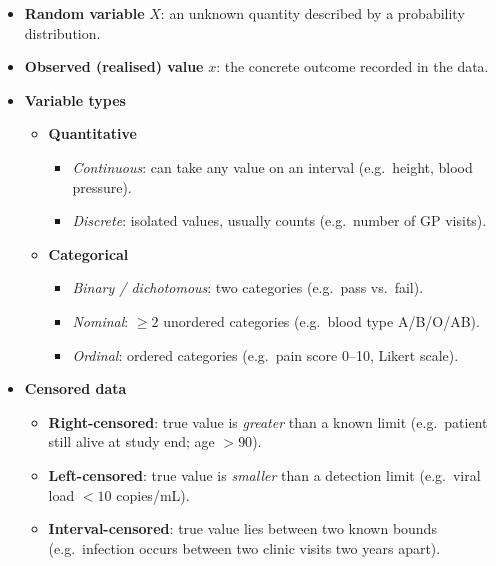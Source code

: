 \documentclass[12pt]{book}
\begin{document}
\begin{itemize}
  \item \textbf{Random variable} $X$: an unknown quantity described by a probability distribution.
  \item \textbf{Observed (realised) value} $x$: the concrete outcome recorded in the data.

  \item \textbf{Variable types}
        \begin{itemize}
          \item \textbf{Quantitative}
                \begin{itemize}
                  \item \emph{Continuous}: can take any value on an interval
                        (e.g.\ height, blood pressure).
                  \item \emph{Discrete}: isolated values, usually counts
                        (e.g.\ number of GP visits).
                \end{itemize}
          \item \textbf{Categorical}
                \begin{itemize}
                  \item \emph{Binary / dichotomous}: two categories
                        (e.g.\ pass vs.\ fail).
                  \item \emph{Nominal}: $\ge 2$ unordered categories
                        (e.g.\ blood type A/B/O/AB).
                  \item \emph{Ordinal}: ordered categories
                        (e.g.\ pain score 0–10, Likert scale).
                \end{itemize}
        \end{itemize}

  \item \textbf{Censored data}
        \begin{itemize}
          \item \textbf{Right-censored}: true value is \emph{greater} than a known limit  
                (e.g.\ patient still alive at study end; age $>90$).
          \item \textbf{Left-censored}: true value is \emph{smaller} than a detection limit  
                (e.g.\ viral load $<10$ copies/mL).
          \item \textbf{Interval-censored}: true value lies between two known bounds  
                (e.g.\ infection occurs between two clinic visits two years apart).
        \end{itemize}
\end{itemize}
\end{document}
